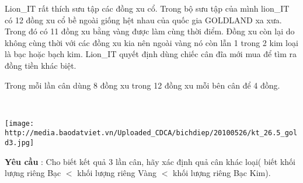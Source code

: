 Lion\_IT rất thích sưu tập các đồng xu cổ. Trong bộ sưu tập của mình lion\_IT có 12 đồng xu cổ bề ngoài giống hệt nhau của quốc gia GOLDLAND xa xưa. Trong đó có 11 đồng xu bằng vàng được làm cùng thời điểm. Đồng xu còn lại do không cùng thời với các đồng xu kia nên ngoài vàng nó còn lẫn 1 trong 2 kim loại là bạc hoặc bạch kim. Lion\_IT quyết định dùng chiếc cân đĩa mới mua để tìm ra đồng tiền khác biệt.

Trong mỗi lần cân dùng 8 đồng xu trong 12 đồng xu mỗi bên cân để 4 đồng.

 


\texttt{[image: http://media.baodatviet.vn/Uploaded\_CDCA/bichdiep/20100526/kt\_26.5\_gold3.jpg]}

\textbf{Yêu cầu} : Cho biết kết quả 3 lần cân, hãy xác định quả cân khác loại( biết khối lượng riêng Bạc $<$ khối lượng riêng Vàng $<$ khối lượng riêng Bạc Kim).